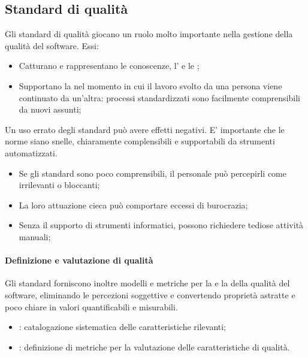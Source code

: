 \subsection{Standard di qualità}

Gli standard di qualità giocano un ruolo molto importante nella gestione della
qualità del software. Essi:

\begin{itemize}
  \item Catturano e rappresentano le conoscenze, l' e le
    ;
  \item Supportano la  nel momento in cui il lavoro svolto da
  una
    persona viene continuato da un'altra: processi standardizzati sono
    facilmente comprensibili da nuovi assunti;
\end{itemize}

Un uso errato degli standard può avere effetti negativi. E' importante che le
norme siano snelle, chiaramente complensibili e supportabili da strumenti
automatizzati.

\begin{itemize}
  \item Se gli standard sono poco comprensibili, il personale può percepirli
    come irrilevanti o bloccanti;
  \item La loro attuazione cieca può comportare eccessi di burocrazia;
  \item Senza il supporto di strumenti informatici, possono richiedere tediose
    attività manuali;
\end{itemize}

\paragraph{Definizione e valutazione di qualità}
\label{par:definizione_e_valutazione_di_qualita}

Gli standard forniscono inoltre modelli e metriche per la  e
la  della qualità del software, eliminando le percezioni
soggettive e convertendo proprietà astratte e poco chiare in valori
quantificabili e misurabili.

\begin{itemize}
  \item {}: catalogazione sistematica
    delle caratteristiche rilevanti;
  \item {}: definizione di metriche per la
    valutazione delle caratteristiche di qualità.
\end{itemize}

